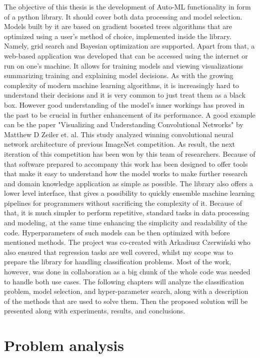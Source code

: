 \documentclass[a4paper,twoside,12pt]{book}
\begin{document}
The objective of this thesis is the development of Auto-ML functionality in form of a python library. It should cover both data processing and model selection. Models built by it are based on gradient boosted trees algorithms that are optimized using a user's method of choice, implemented inside the library. Namely, grid search and Bayesian optimization are supported. Apart from that, a web-based application was developed that can be accessed using the internet or run on one's machine. It allows for training models and viewing visualizations summarizing training and explaining model decisions. As with the growing complexity of modern machine learning algorithms, it is increasingly hard to understand their decisions and it is very common to just treat them as a black box. However good understanding of the model's inner workings has proved in the past to be crucial in further enhancement of its performance. A good example can be the paper "Visualizing and Understanding Convolutional Networks" \cite{VisNeuralNet} by Matthew D Zeiler et. al. This study analyzed winning convolutional neural network architecture of previous ImageNet competition. As result, the next iteration of this competition has been won by this team of researchers.
Because of that software prepared to accompany this work has been designed to offer tools that make it easy to understand how the model works to make further research and domain knowledge application as simple as possible.
The library also offers a lower level interface, that gives a possibility to quickly ensemble machine learning pipelines for programmers without sacrificing the complexity of it. Because of that, it is much simpler to perform repetitive, standard tasks in data processing and modeling, at the same time enhancing the simplicity and readability of the code. Hyperparameters of such models can be then optimized with before mentioned methods.
The project was co-created with Arkadiusz Czerwiński who also ensured that regression tasks are well covered, whilst my scope was to prepare the library for handling classification problems. Most of the work, however, was done in collaboration as a big chunk of the whole code was needed to handle both use cases. The following chapters will analyze the classification problem, model selection, and hyper-parameter search, along with a description of the methods that are used to solve them. Then the proposed solution will be presented along with experiments, results, and conclusions.




\chapter{Problem analysis}
\end{document}
